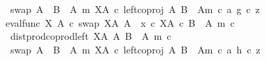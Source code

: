 \begin{isabellebody}
\ \ \ \ \ \ \ \ \ \ \ \ swap\ {\isacharparenleft}{\kern0pt}A\ {\isasymCoprod}\ {\isacharparenleft}{\kern0pt}B\ {\isasymsetminus}\ {\isacharparenleft}{\kern0pt}A{\isacharcomma}{\kern0pt}\ m{\isacharparenright}{\kern0pt}{\isacharparenright}{\kern0pt}{\isacharparenright}{\kern0pt}\ {\isacharparenleft}{\kern0pt}X\isactrlbsup A\isactrlesup {\isacharparenright}{\kern0pt}\ {\isasymcirc}\isactrlsub c\ {\isasymlangle}left{\isacharunderscore}{\kern0pt}coproj\ A\ {\isacharparenleft}{\kern0pt}B\ {\isasymsetminus}\ {\isacharparenleft}{\kern0pt}A{\isacharcomma}{\kern0pt}m{\isacharparenright}{\kern0pt}{\isacharparenright}{\kern0pt}\ {\isasymcirc}\isactrlsub c\ a{\isacharcomma}{\kern0pt}\ g\ {\isasymcirc}\isactrlsub c\ z{\isasymrangle}\isanewline
\ \ \ \ \ \ \ \ \ \ {\isacharequal}{\kern0pt}\ {\isacharparenleft}{\kern0pt}eval{\isacharunderscore}{\kern0pt}func\ X\ A\ {\isasymcirc}\isactrlsub c\ swap\ {\isacharparenleft}{\kern0pt}X\isactrlbsup A\isactrlesup {\isacharparenright}{\kern0pt}\ A{\isacharparenright}{\kern0pt}\ {\isasymamalg}\ {\isacharparenleft}{\kern0pt}x\ {\isasymcirc}\isactrlsub c\ {\isasymbeta}\isactrlbsub X\isactrlbsup A\isactrlesup \ {\isasymtimes}\isactrlsub c\ {\isacharparenleft}{\kern0pt}B\ {\isasymsetminus}\ {\isacharparenleft}{\kern0pt}A{\isacharcomma}{\kern0pt}\ m{\isacharparenright}{\kern0pt}{\isacharparenright}{\kern0pt}\isactrlesub {\isacharparenright}{\kern0pt}\ {\isasymcirc}\isactrlsub c\isanewline
\ \ \ \ \ \ \ \ \ \ \ \ dist{\isacharunderscore}{\kern0pt}prod{\isacharunderscore}{\kern0pt}coprod{\isacharunderscore}{\kern0pt}left\ {\isacharparenleft}{\kern0pt}X\isactrlbsup A\isactrlesup {\isacharparenright}{\kern0pt}\ A\ {\isacharparenleft}{\kern0pt}B\ {\isasymsetminus}\ {\isacharparenleft}{\kern0pt}A{\isacharcomma}{\kern0pt}\ m{\isacharparenright}{\kern0pt}{\isacharparenright}{\kern0pt}\ {\isasymcirc}\isactrlsub c\isanewline
\ \ \ \ \ \ \ \ \ \ \ \ swap\ {\isacharparenleft}{\kern0pt}A\ {\isasymCoprod}\ {\isacharparenleft}{\kern0pt}B\ {\isasymsetminus}\ {\isacharparenleft}{\kern0pt}A{\isacharcomma}{\kern0pt}\ m{\isacharparenright}{\kern0pt}{\isacharparenright}{\kern0pt}{\isacharparenright}{\kern0pt}\ {\isacharparenleft}{\kern0pt}X\isactrlbsup A\isactrlesup {\isacharparenright}{\kern0pt}\ {\isasymcirc}\isactrlsub c\ {\isasymlangle}left{\isacharunderscore}{\kern0pt}coproj\ A\ {\isacharparenleft}{\kern0pt}B\ {\isasymsetminus}\ {\isacharparenleft}{\kern0pt}A{\isacharcomma}{\kern0pt}m{\isacharparenright}{\kern0pt}{\isacharparenright}{\kern0pt}\ {\isasymcirc}\isactrlsub c\ a{\isacharcomma}{\kern0pt}\ h\ {\isasymcirc}\isactrlsub c\ z{\isasymrangle}{\isachardoublequoteclose}\isanewline

\end{isabellebody}
